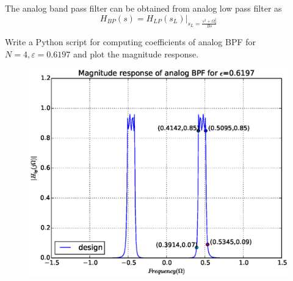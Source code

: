 \documentclass[journal,12pt,twocolumn]{IEEEtran}
\begin{document}
The analog band pass filter can be obtained from analog low pass filter as
\begin{equation}
H_{BP}(s) = H_{LP}(s_L)|_{s_L=\frac{s^2+\Omega_0^2}{Bs}}
\end{equation}
\begin{problem}
Write a Python script for computing coefficients of analog BPF for $N=4, \varepsilon = 0.6197$ and plot the magnitude response.
\end{problem}
\solution

\begin{figure}
\centering
\includegraphics[width=\columnwidth]{./figs/analog_bpf.eps}
\caption{}
\label{fig:analog_bpf}
\end{figure}
\end{document}
